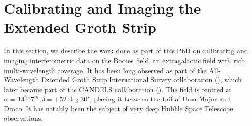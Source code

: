 
\section{Calibrating and Imaging the Extended Groth Strip}\label{section.calibration}
\pg
In this section, we describe the work done as part of this PhD on calibrating and imaging interferometric data on the Boötes field, an extragalactic field with rich multi-wavelength coverage. It has been long observed as part of the All-Wavelength Extended Groth Strip International Survey collaboration (), which later became part of the CANDELS collaboration (). The field is centred at $\alpha=14^h17^m,\delta=+52\deg 30'$, placing it between the tail of Ursa Major and Draco. It has notably been the subject of very deep Hubble Space Telescope observations, 

\newpage


